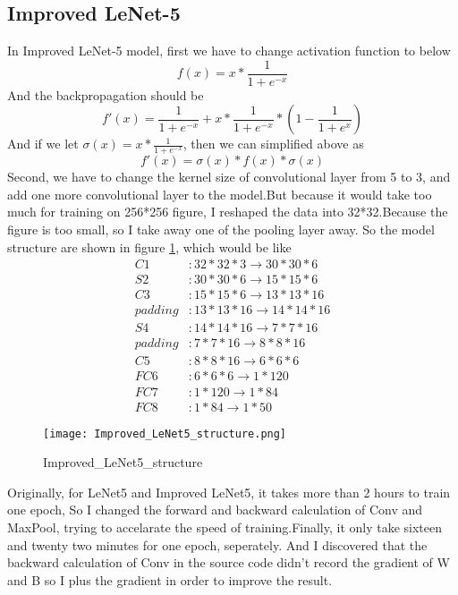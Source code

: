 \documentclass[conference]{IEEEtran}
\begin{document}
    \subsection{Improved LeNet-5}
    In Improved LeNet-5 model, first we have to change activation function to below
    \begin{equation}
        f(x) = x * \frac{1}{1 + e^{-x}}
    \end{equation}
    And the backpropagation should be 
    \begin{equation}
        f'(x) = \frac{1}{1 + e^{-x}} + x * \frac{1}{1 + e^{-x}} * (1 - \frac{1}{1 + e^{x}})
    \end{equation}
    And if we let $\sigma(x) = x * \frac{1}{1 + e^{-x}}$, then we can simplified above as
    \begin{equation}
        f'(x) = \sigma(x) * f(x) * \sigma(x)
    \end{equation}
    Second, we have to change the kernel size of convolutional layer from 5 to 3, and add one more convolutional layer to the model.But because it would take too much for training on 256*256 figure, I reshaped the data into 32*32.Because the figure is too small, so I take away one of the pooling layer away. So the model structure are shown in figure \ref{fig:Improved_LeNet5_structure}, which would be like
    \begin{equation}
    \begin{aligned}
        C1 &: 32*32*3 \rightarrow 30*30*6 \\
        S2 &: 30*30*6 \rightarrow 15*15*6 \\
        C3 &: 15*15*6 \rightarrow 13*13*16 \\
        padding &: 13*13*16 \rightarrow 14*14*16 \\
        S4 &: 14*14*16 \rightarrow 7*7*16 \\
        padding &: 7*7*16 \rightarrow 8*8*16 \\
        C5 &: 8*8*16 \rightarrow 6*6*6 \\
        FC6 &: 6*6*6 \rightarrow 1*120 \\
        FC7 &: 1*120 \rightarrow 1*84 \\
        FC8 &: 1*84 \rightarrow 1*50
    \end{aligned}
    \end{equation}
    \begin{figure}[htb]
        \centering
        \texttt{[image: Improved\_LeNet5\_structure.png]}
        \caption{Improved_LeNet5_structure}
        \label{fig:Improved_LeNet5_structure}
    \end{figure}
    \indent Originally, for LeNet5 and Improved LeNet5, it takes more than 2 hours to train one epoch, So I changed the forward and backward calculation of Conv and MaxPool, trying to accelarate the speed of training.Finally, it only take sixteen and twenty two minutes for one epoch, seperately.
    \indent And I discovered that the backward calculation of Conv in the source code didn't record the gradient of W and B so I plus the gradient in order to improve the result.
\end{document}
